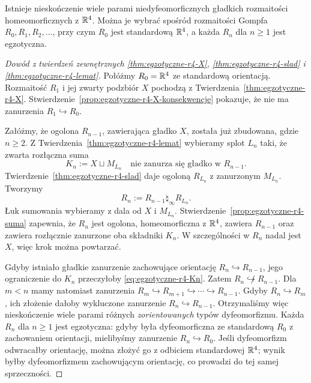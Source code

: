 \begin{twierdzenie}
\label{thm:egzotyczne-r4-nieskonczenie}
Istnieje nieskończenie wiele parami niedyfeomorficznych
gładkich rozmaitości homeomorficznych z $\mathbb{R}^4$.
Można je wybrać spośród rozmaitości Gompfa
$R_0,R_1,R_2,\ldots$, przy czym $R_0$ jest
standardową $\mathbb{R}^4$, a każda $R_n$ dla $n\geq1$
jest egzotyczna.
\end{twierdzenie}
\begin{proof}[Dowód z twierdzeń zewnętrznych
\ref{thm:egzotyczne-r4-X},
\ref{thm:egzotyczne-r4-slad} i
\ref{thm:egzotyczne-r4-lemat}]
Połóżmy $R_0=\mathbb{R}^4$ ze standardową orientacją.
Rozmaitość $R_1$ i jej zwarty podzbiór $X$
pochodzą z Twierdzenia~\ref{thm:egzotyczne-r4-X}.
Stwierdzenie~\ref{prop:egzotyczne-r4-X-konsekwencje}
pokazuje, że nie ma zanurzenia $R_1\hookrightarrow R_0$.

Załóżmy, że ogolona $R_{n-1}$, zawierająca
gładko $X$, została już zbudowana, gdzie $n\geq2$.
Z Twierdzenia~\ref{thm:egzotyczne-r4-lemat}
wybieramy splot $L_n$ taki, że zwarta
rozłączna suma
\begin{equation}\label{eq:egzotyczne-r4-Kn}
 K_n:=X\sqcup M_{L_n}
 \quad\text{nie zanurza się gładko w }R_{n-1}.
\end{equation}
Twierdzenie~\ref{thm:egzotyczne-r4-slad}
daje ogoloną $R_{L_n}$ z zanurzonym
$M_{L_n}$. Tworzymy
\begin{equation}\label{eq:egzotyczne-r4-Rn}
 R_n:=R_{n-1}\mathbin{\natural_\infty}R_{L_n}.
\end{equation}
Łuk sumowania wybieramy z dala od $X$ i
$M_{L_n}$. Stwierdzenie~\ref{prop:egzotyczne-r4-suma}
zapewnia, że $R_n$ jest ogolona,
homeomorficzna z $\mathbb{R}^4$, zawiera $R_{n-1}$
oraz zawiera rozłącznie zanurzone oba składniki
$K_n$. W szczególności w $R_n$ nadal jest $X$,
więc krok można powtarzać.

Gdyby istniało gładkie zanurzenie zachowujące
orientację $R_n\hookrightarrow R_{n-1}$,
jego ograniczenie do $K_n$ przeczyłoby
\eqref{eq:egzotyczne-r4-Kn}. Zatem
$R_n\not\hookrightarrow R_{n-1}$.
Dla $m<n$ mamy natomiast zanurzenia
$R_m\hookrightarrow R_{m+1}\hookrightarrow
\cdots\hookrightarrow R_{n-1}$. Gdyby
$R_n\hookrightarrow R_m$, ich złożenie
dałoby wykluczone zanurzenie
$R_n\hookrightarrow R_{n-1}$. Otrzymaliśmy
więc nieskończenie wiele parami różnych
\emph{zorientowanych} typów dyfeomorfizmu.
Każda $R_n$ dla $n\geq1$ jest egzotyczna:
gdyby była dyfeomorficzna ze standardową
$R_0$ z zachowaniem orientacji, mielibyśmy
zanurzenie $R_n\hookrightarrow R_0$. Jeśli
dyfeomorfizm odwracałby orientację, można
złożyć go z odbiciem standardowej $\mathbb{R}^4$;
wynik byłby dyfeomorfizmem zachowującym
orientację, co prowadzi do tej samej sprzeczności.


\end{proof}
